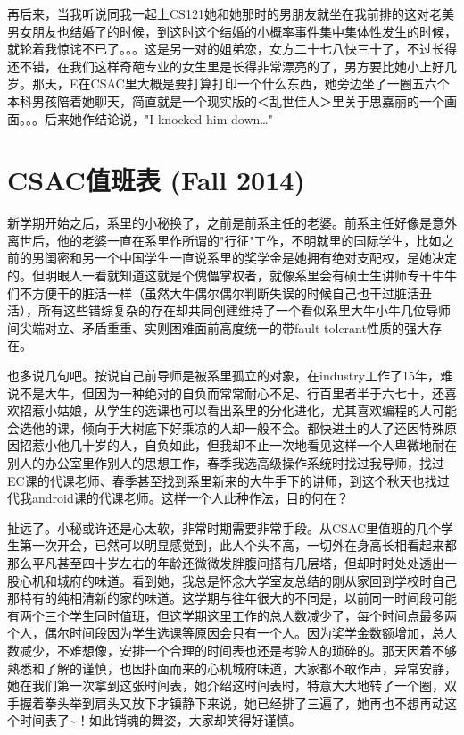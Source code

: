 \documentclass[12pt]{book}
\begin{document}
再后来，当我听说同我一起上CS121她和她那时的男朋友就坐在我前排的这对老美男女朋友也结婚了的时候，到这时这个结婚的小概率事件集中集体性发生的时候，就轮着我惊诧不已了。。。这是另一对的姐弟恋，女方二十七八快三十了，不过长得还不错，在我们这样奇葩专业的女生里是长得非常漂亮的了，男方要比她小上好几岁。那天，E在CSAC里大概是要打算打印一个什么东西，她旁边坐了一圈五六个本科男孩陪着她聊天，简直就是一个现实版的＜乱世佳人＞里关于思嘉丽的一个画面。。。后来她作结论说，"I knocked him down…"

\chapter{CSAC值班表 (Fall 2014)}
\label{sec-12}

新学期开始之后，系里的小秘换了，之前是前系主任的老婆。前系主任好像是意外离世后，他的老婆一直在系里作所谓的"行征"工作，不明就里的国际学生，比如之前的男闺密和另一个中国学生一直说系里的奖学金是她拥有绝对支配权，是她决定的。但明眼人一看就知道这就是个傀儡掌权者，就像系里会有硕士生讲师专干牛牛们不方便干的脏活一样（虽然大牛偶尔偶尔判断失误的时候自己也干过脏活丑活），所有这些错综复杂的存在却共同创建维持了一个看似系里大牛小牛几位导师间尖端对立、矛盾重重、实则困难面前高度统一的带fault tolerant性质的强大存在。

也多说几句吧。按说自己前导师是被系里孤立的对象，在industry工作了15年，难说不是大牛，但因为一种绝对的自负而常常耐心不足、行百里者半于六七十，还喜欢招惹小姑娘，从学生的选课也可以看出系里的分化进化，尤其喜欢编程的人可能会选他的课，倾向于大树底下好乘凉的人却一般不会。都快进土的人了还因特殊原因招惹小他几十岁的人，自负如此，但我却不止一次地看见这样一个人卑微地耐在别人的办公室里作别人的思想工作，春季我选高级操作系统时找过我导师，找过EC课的代课老师、春季甚至找到系里新来的大牛手下的讲师，到这个秋天也找过代我android课的代课老师。这样一个人此种作法，目的何在？

扯远了。小秘或许还是心太软，非常时期需要非常手段。从CSAC里值班的几个学生第一次开会，已然可以明显感觉到，此人个头不高，一切外在身高长相看起来都那么平凡甚至四十岁左右的年龄还微微发胖腹间搭有几层塔，但却时时处处透出一股心机和城府的味道。看到她，我总是怀念大学室友总结的刚从家回到学校时自己那特有的纯相清新的家的味道。这学期与往年很大的不同是，以前同一时间段可能有两个三个学生同时值班，但这学期这里工作的总人数减少了，每个时间点最多两个人，偶尔时间段因为学生选课等原因会只有一个人。因为奖学金数额增加，总人数减少，不难想像，安排一个合理的时间表也还是考验人的琐碎的。那天因着不够熟悉和了解的谨慎，也因扑面而来的心机城府味道，大家都不敢作声，异常安静，她在我们第一次拿到这张时间表，她介绍这时间表时，特意大大地转了一个圈，双手握着拳头举到肩头又放下才镇静下来说，她已经排了三遍了，她再也不想再动这个时间表了\textasciitilde{}！如此销魂的舞姿，大家却笑得好谨慎。
\end{document}
